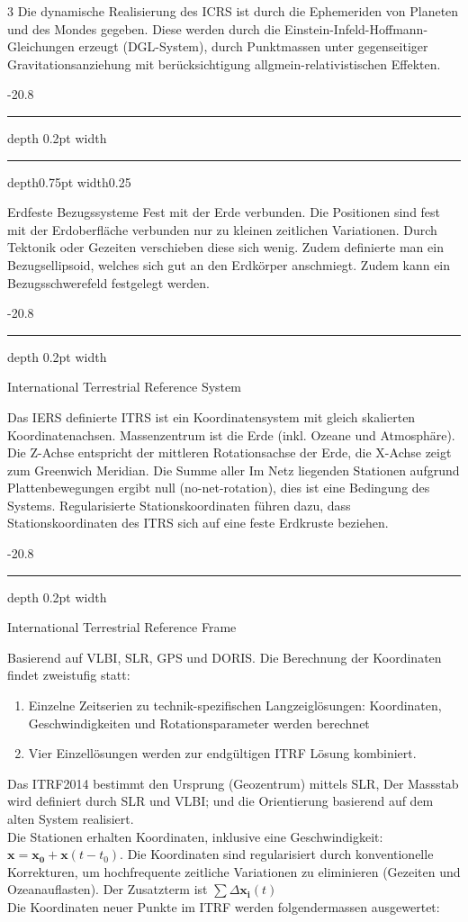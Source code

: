 \documentclass[9pt, landscape, fleqn]{scrartcl}
\makeatletter
\renewcommand{\subsection}{\@startsection{subsection}{1}{0mm}%
{-2\baselineskip}{0.8\baselineskip}%
{\hrule depth 0.2pt width\columnwidth\hrule depth0.75pt
width0.25\columnwidth\vspace*{1.2em}\large\bfseries\rmfamily}}
\renewcommand{\subsubsection}{\@startsection{subsubsection}{1}{0mm}%
{-2\baselineskip}{0.8\baselineskip}%
{\hrule depth 0.2pt width\columnwidth\vspace*{1.2em}\normalsize\bfseries\rmfamily}}
\makeatother
\begin{document}
\begin{multicols*}{3}
Die dynamische Realisierung des ICRS ist durch die Ephemeriden von Planeten und des Mondes gegeben. Diese werden durch die Einstein-Infeld-Hoffmann-Gleichungen erzeugt (DGL-System), durch Punktmassen unter gegenseitiger Gravitationsanziehung mit berücksichtigung allgmein-relativistischen Effekten.

\subsection{Erdfeste Bezugssysteme}
Fest mit der Erde verbunden. Die Positionen sind fest mit der Erdoberfläche verbunden nur zu kleinen zeitlichen Variationen. Durch Tektonik oder Gezeiten verschieben diese sich wenig. Zudem definierte man ein Bezugsellipsoid, welches sich gut an den Erdkörper anschmiegt. Zudem kann ein Bezugsschwerefeld festgelegt werden.

\subsubsection{International Terrestrial Reference System}

Das IERS definierte ITRS ist ein Koordinatensystem mit gleich skalierten Koordinatenachsen. Massenzentrum ist die Erde (inkl. Ozeane und Atmosphäre). Die Z-Achse entspricht der mittleren Rotationsachse der Erde, 
die X-Achse zeigt zum Greenwich Meridian. Die Summe aller Im Netz liegenden Stationen aufgrund Plattenbewegungen ergibt null (no-net-rotation), dies ist eine Bedingung des Systems. Regularisierte Stationskoordinaten führen dazu, dass Stationskoordinaten des ITRS sich auf eine feste Erdkruste beziehen.

\subsubsection{International Terrestrial Reference Frame}

Basierend auf VLBI, SLR, GPS und DORIS. Die Berechnung der Koordinaten findet zweistufig statt:

\begin{enumerate}
    \item Einzelne Zeitserien zu technik-spezifischen Langzeiglösungen: Koordinaten, Geschwindigkeiten und Rotationsparameter werden berechnet
    \item Vier Einzellösungen werden zur endgültigen ITRF Lösung kombiniert.
\end{enumerate}

Das ITRF2014 bestimmt den Ursprung (Geozentrum) mittels SLR, Der Massstab wird definiert durch SLR und VLBI; und die Orientierung basierend auf dem alten System realisiert. \\
Die Stationen erhalten Koordinaten, inklusive eine Geschwindigkeit: $\mathbf{x} = \mathbf{x_0} + \mathbf{x}(t-t_0)$. Die Koordinaten sind regularisiert durch konventionelle Korrekturen, um hochfrequente zeitliche Variationen zu eliminieren (Gezeiten und Ozeanauflasten). Der Zusatzterm ist $\sum \Delta \mathbf{x_i}(t)$ \\
Die Koordinaten neuer Punkte im ITRF werden folgendermassen ausgewertet:


\end{multicols*}
\end{document}
